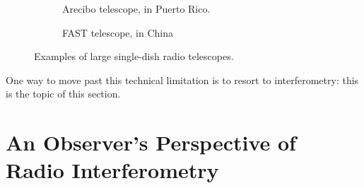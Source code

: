 \begin{figure}[ht]
\centering
\begin{subfigure}{.48\textwidth}
\caption{\label{fig.arecibo} Arecibo telescope, in Puerto Rico.}
\end{subfigure}
\hfill
\begin{subfigure}{.48\textwidth}
\caption{\label{fig.FAST} FAST telescope, in China}
\end{subfigure}
\caption{\label{fig.singleDishes} Examples of large single-dish radio telescopes.}
\end{figure}

\pg
One way to move past this technical limitation is to resort to interferometry: this is the topic of this section.

\section{An Observer's Perspective of Radio Interferometry}

